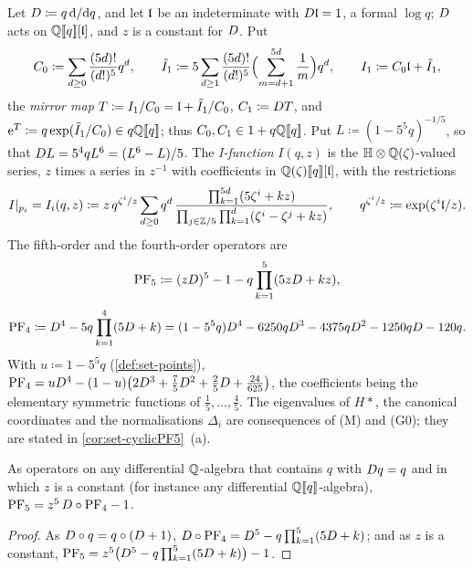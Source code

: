 \begin{defn}
\label{def:set-genus0}
Let $D\coloneqq q\,\mathrm{d}/\mathrm{d} q$, and let $\mathfrak{l}$ be an indeterminate with $D\mathfrak{l}=1$, a formal $\log q$; $D$ acts on $\mathbb{Q}[\![ q ]\!][\mathfrak{l}]$, and $z$ is a constant for $D$. Put
\[
C_0\coloneqq\sum_{d\geq0}\frac{(5d)!}{(d!)^5}q^d,\qquad\tilde I_1\coloneqq5\sum_{d\geq1}\frac{(5d)!}{(d!)^5}\Bigl(\sum_{m=d+1}^{5d}\frac1m\Bigr)q^d,\qquad I_1\coloneqq C_0\mathfrak{l}+\tilde I_1,
\]
the \emph{mirror map} $T\coloneqq I_1/C_0=\mathfrak{l}+\tilde I_1/C_0$, $C_1\coloneqq D T$, and $\mathrm{e}^T\coloneqq q\exp(\tilde I_1/C_0)\in q\mathbb{Q}[\![ q ]\!]$; thus $C_0,C_1\in1+q\mathbb{Q}[\![ q ]\!]$. Put $L\coloneqq(1-5^5q)^{-1/5}$, so that $D L=5^4qL^6=(L^6-L)/5$. The \emph{I-function} $I(q,z)$ is the $\mathbb{H}\otimes\mathbb{Q}(\zeta)$-valued series, $z$ times a series in $z^{-1}$ with coefficients in $\mathbb{Q}(\zeta)[\![ q ]\!][\mathfrak{l}]$, with the restrictions
\[
I|_{p_i}=I_i(q,z)\coloneqq z\,q^{\zeta^i/z}\sum_{d\geq0}q^d\,\frac{\prod_{k=1}^{5d}(5\zeta^i+kz)}{\prod_{j\in\mathbb{Z}/5}\prod_{k=1}^{d}(\zeta^i-\zeta^j+kz)},\qquad q^{\zeta^i/z}\coloneqq\exp(\zeta^i\mathfrak{l}/z).
\]
The fifth-order and the fourth-order operators are
\begin{equation}
\label{eq:set-PF5}
\mathrm{PF}_{5}\coloneqq(zD)^5-1-q\prod_{k=1}^5(5zD+kz),
\end{equation}
\begin{equation}
\label{eq:set-PF4}
\mathrm{PF}_{4}\coloneqq D^4-5q\prod_{k=1}^4(5D+k)=(1-5^5q)D^4-6250qD^3-4375qD^2-1250qD-120q .
\end{equation}
With $u\coloneqq1-5^5q$ (\cref{def:set-points}), $\mathrm{PF}_{4}=uD^4-(1-u)\bigl(2D^3+\frac75D^2+\frac25D+\frac{24}{625}\bigr)$, the coefficients being the elementary symmetric functions of $\frac15,\dots,\frac45$. The eigenvalues of $H*$, the canonical coordinates and the normalisations $\Delta_i$ are consequences of (M) and (G0); they are stated in \cref{cor:set-cyclicPF5}~(a).
\end{defn}

\begin{lem}[$\PFfive=z^5\Dq\PFfour-1$]
\label{lem:set-pf5}
As operators on any differential $\mathbb{Q}$-algebra that contains $q$ with $D q=q$ and in which $z$ is a constant (for instance any differential $\mathbb{Q}[\![ q ]\!]$-algebra), $\mathrm{PF}_{5}=z^5\,D\circ\mathrm{PF}_{4}-1$.
\end{lem}

\begin{proof}
As $D\circ q=q\circ(D+1)$, $D\circ\mathrm{PF}_{4}=D^5-q\prod_{k=1}^5(5D+k)$; and as $z$ is a constant, $\mathrm{PF}_{5}=z^5\bigl(D^5-q\prod_{k=1}^5(5D+k)\bigr)-1$.
\end{proof}

